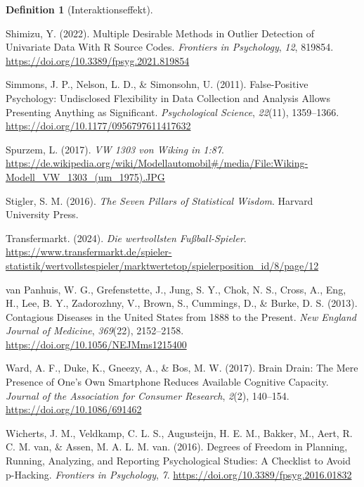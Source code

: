 \documentclass[
  letterpaper,
]{scrbook}
\newlength{\cslhangindent}
\newenvironment{CSLReferences}[2] %
 {\begin{list}{}{%
  \setlength{\itemindent}{0pt}
  \setlength{\leftmargin}{0pt}
  \setlength{\parsep}{0pt}
  \ifodd #1
   \setlength{\leftmargin}{\cslhangindent}
   \setlength{\itemindent}{-1\cslhangindent}
  \fi
  \setlength{\itemsep}{#2\baselineskip}}}
 {\end{list}}
\theoremstyle{definition}
\theoremstyle{definition}
\theoremstyle{definition}
\newtheorem{definition}{Definition}[chapter]
\theoremstyle{remark}
\begin{document}
\begin{definition}[Interaktionseffekt]
\begin{CSLReferences}{1}{0}
Shimizu, Y. (2022). Multiple {Desirable Methods} in {Outlier Detection}
of {Univariate Data With R Source Codes}. \emph{Frontiers in
Psychology}, \emph{12}, 819854.
\url{https://doi.org/10.3389/fpsyg.2021.819854}

Simmons, J. P., Nelson, L. D., \& Simonsohn, U. (2011). False-{Positive
Psychology}: {Undisclosed Flexibility} in {Data Collection} and
{Analysis Allows Presenting Anything} as {Significant}.
\emph{Psychological Science}, \emph{22}(11), 1359--1366.
\url{https://doi.org/10.1177/0956797611417632}

Spurzem, L. (2017). \emph{{VW} 1303 von {Wiking} in 1:87}.
\url{https://de.wikipedia.org/wiki/Modellautomobil\#/media/File:Wiking-Modell_VW_1303_(um_1975).JPG}

Stigler, S. M. (2016). \emph{The Seven Pillars of Statistical Wisdom}.
Harvard University Press.

Transfermarkt. (2024). \emph{Die wertvollsten Fußball-Spieler}.
\url{https://www.transfermarkt.de/spieler-statistik/wertvollstespieler/marktwertetop/spielerposition_id/8/page/12}

van Panhuis, W. G., Grefenstette, J., Jung, S. Y., Chok, N. S., Cross,
A., Eng, H., Lee, B. Y., Zadorozhny, V., Brown, S., Cummings, D., \&
Burke, D. S. (2013). Contagious {Diseases} in the {United States} from
1888 to the {Present}. \emph{New England Journal of Medicine},
\emph{369}(22), 2152--2158. \url{https://doi.org/10.1056/NEJMms1215400}

Ward, A. F., Duke, K., Gneezy, A., \& Bos, M. W. (2017). Brain {Drain}:
{The Mere Presence} of {One}'s {Own Smartphone Reduces Available
Cognitive Capacity}. \emph{Journal of the Association for Consumer
Research}, \emph{2}(2), 140--154. \url{https://doi.org/10.1086/691462}

Wicherts, J. M., Veldkamp, C. L. S., Augusteijn, H. E. M., Bakker, M.,
Aert, R. C. M. van, \& Assen, M. A. L. M. van. (2016). Degrees of
{Freedom} in {Planning}, {Running}, {Analyzing}, and {Reporting
Psychological Studies}: {A Checklist} to {Avoid} p-{Hacking}.
\emph{Frontiers in Psychology}, \emph{7}.
\url{https://doi.org/10.3389/fpsyg.2016.01832}


\end{CSLReferences}
\end{definition}
\end{document}
